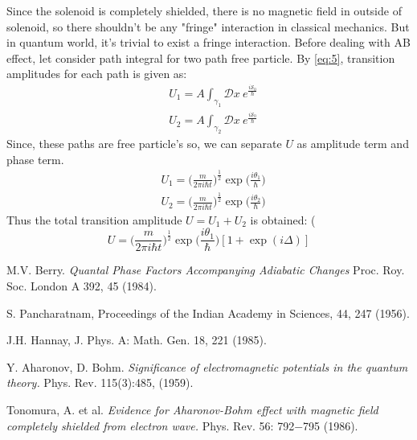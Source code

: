 \documentclass[%
 reprint,
 amsmath,amssymb,
 aps,
]{revtex4-1}
\begin{document}
Since the solenoid is completely shielded, there is no magnetic field in outside of solenoid, so there shouldn't be any "fringe" interaction in classical mechanics. But in quantum world, it's trivial to exist a fringe interaction. Before dealing with AB effect, let consider path integral for two path free particle. By \eqref{eq:5}, transition amplitudes for each path is given as:
\begin{equation}\label{eq:7}
\begin{split}
&U_1=A\int_{\gamma_1}\mathcal{D}x\ e^{\frac{i\mathcal{S}_0}{\hbar}}\\
&U_2=A\int_{\gamma_2}\mathcal{D}x\ e^{\frac{i\mathcal{S}_0}{\hbar}}
\end{split}
\end{equation}
Since, these paths are free particle's so, we can separate $U$ as amplitude term and phase term. 
\begin{equation}\label{eq:8}
\begin{split}
&U_1=\Big(\frac{m}{2\pi i\hbar t}\Big)^{\frac{1}{2}}\exp\Big(\frac{i\theta_1}{\hbar}\Big)\\
&U_2=\Big(\frac{m}{2\pi i\hbar t}\Big)^{\frac{1}{2}}\exp\Big(\frac{i\theta_2}{\hbar}\Big)
\end{split}
\end{equation}
Thus the total transition amplitude \(U=U_1+U_2\) is obtained: (
\begin{equation}
U=\Big(\frac{m}{2\pi i\hbar t}\Big)^{\frac{1}{2}}\exp\Big(\frac{i\theta_1}{\hbar}\Big)[1+\exp(i\Delta)]
\end{equation}

\begin{thebibliography}{9}
M.V. Berry. \textit{Quantal Phase Factors Accompanying Adiabatic Changes} Proc. Roy. Soc. London A 392, 45 (1984).

S. Pancharatnam, Proceedings of the Indian Academy in Sciences, 44, 247 (1956).

J.H. Hannay, J. Phys. A: Math. Gen. 18, 221 (1985).

Y. Aharonov, D. Bohm. \textit{Signiﬁcance of electromagnetic potentials in the quantum theory.} Phys. Rev. 115(3):485, (1959).

Tonomura, A. et al. \textit{Evidence for Aharonov-Bohm effect with magnetic field completely shielded from electron wave.} Phys. Rev. 56: 792$-$795 (1986).

\end{thebibliography}
\end{document}

